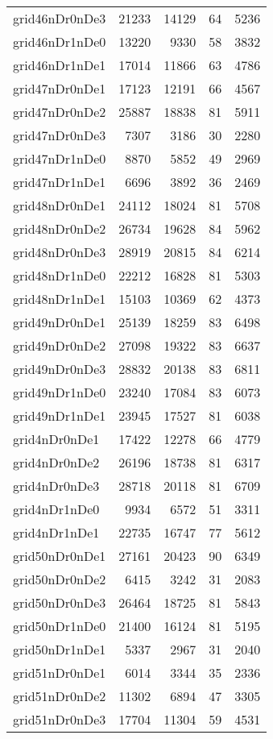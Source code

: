\begin{longtable}{lrrrr}
grid46nDr0nDe3 & 21233 & 14129 & 64 & 5236 \\
grid46nDr1nDe0 & 13220 & 9330 & 58 & 3832 \\
grid46nDr1nDe1 & 17014 & 11866 & 63 & 4786 \\
grid47nDr0nDe1 & 17123 & 12191 & 66 & 4567 \\
grid47nDr0nDe2 & 25887 & 18838 & 81 & 5911 \\
grid47nDr0nDe3 & 7307 & 3186 & 30 & 2280 \\
grid47nDr1nDe0 & 8870 & 5852 & 49 & 2969 \\
grid47nDr1nDe1 & 6696 & 3892 & 36 & 2469 \\
grid48nDr0nDe1 & 24112 & 18024 & 81 & 5708 \\
grid48nDr0nDe2 & 26734 & 19628 & 84 & 5962 \\
grid48nDr0nDe3 & 28919 & 20815 & 84 & 6214 \\
grid48nDr1nDe0 & 22212 & 16828 & 81 & 5303 \\
grid48nDr1nDe1 & 15103 & 10369 & 62 & 4373 \\
grid49nDr0nDe1 & 25139 & 18259 & 83 & 6498 \\
grid49nDr0nDe2 & 27098 & 19322 & 83 & 6637 \\
grid49nDr0nDe3 & 28832 & 20138 & 83 & 6811 \\
grid49nDr1nDe0 & 23240 & 17084 & 83 & 6073 \\
grid49nDr1nDe1 & 23945 & 17527 & 81 & 6038 \\
grid4nDr0nDe1 & 17422 & 12278 & 66 & 4779 \\
grid4nDr0nDe2 & 26196 & 18738 & 81 & 6317 \\
grid4nDr0nDe3 & 28718 & 20118 & 81 & 6709 \\
grid4nDr1nDe0 & 9934 & 6572 & 51 & 3311 \\
grid4nDr1nDe1 & 22735 & 16747 & 77 & 5612 \\
grid50nDr0nDe1 & 27161 & 20423 & 90 & 6349 \\
grid50nDr0nDe2 & 6415 & 3242 & 31 & 2083 \\
grid50nDr0nDe3 & 26464 & 18725 & 81 & 5843 \\
grid50nDr1nDe0 & 21400 & 16124 & 81 & 5195 \\
grid50nDr1nDe1 & 5337 & 2967 & 31 & 2040 \\
grid51nDr0nDe1 & 6014 & 3344 & 35 & 2336 \\
grid51nDr0nDe2 & 11302 & 6894 & 47 & 3305 \\
grid51nDr0nDe3 & 17704 & 11304 & 59 & 4531 \\

\end{longtable}

